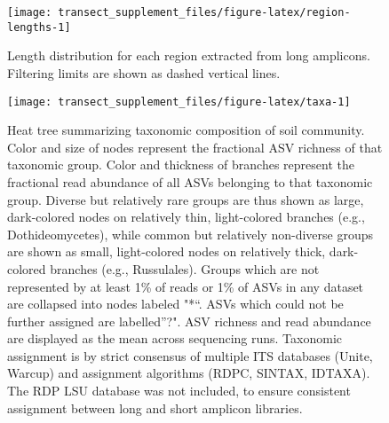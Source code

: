 \documentclass[
]{article}
\begin{document}
\begin{figure}

{\centering \texttt{[image: transect\_supplement\_files/figure-latex/region-lengths-1]} 

}

\caption[Length distribution for each region extracted from long amplicons]{Length distribution for each region extracted from long amplicons. Filtering limits are shown as dashed vertical lines.}\label{fig:region-lengths}
\end{figure}












\begin{figure}

{\centering \texttt{[image: transect\_supplement\_files/figure-latex/taxa-1]} 

}

\caption[Heat tree summarizing taxonomic composition of soil community]{Heat tree summarizing taxonomic composition of soil community. Color and size of nodes represent the fractional ASV richness of that taxonomic group.
Color and thickness of branches represent the fractional read abundance of all ASVs belonging to that taxonomic group.
Diverse but relatively rare groups are thus shown as large, dark-colored nodes on relatively thin, light-colored branches (e.g., Dothideomycetes), while common but relatively non-diverse groups are shown as small, light-colored nodes on relatively thick, dark-colored branches (e.g., Russulales).
Groups which are not represented by at least 1\% of reads or 1\% of ASVs in any dataset are collapsed into nodes labeled "*``.
ASVs which could not be further assigned are labelled''?".
ASV richness and read abundance are displayed as the mean across sequencing runs.
Taxonomic assignment is by strict consensus of multiple ITS databases (Unite, Warcup) and assignment algorithms (RDPC, SINTAX, IDTAXA).
The RDP LSU database was not included, to ensure consistent assignment between long and short amplicon libraries.}\label{fig:taxa}
\end{figure}
\end{document}
